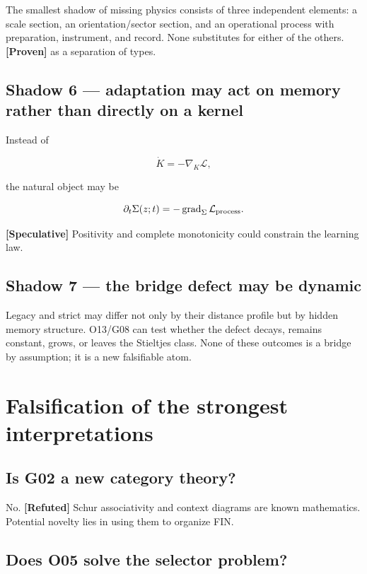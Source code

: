 \documentclass[11pt,a4paper,openany]{report}
\newcommand{\statusProven}{\textcolor{fingreen}{[Proven]}}
\newcommand{\statusSpeculative}{\textcolor{finorange}{[Speculative]}}
\newcommand{\statusRefuted}{\textcolor{finred}{[Refuted]}}
\begin{document}
The smallest shadow of missing physics consists of three independent elements: a scale section, an orientation/\allowbreak{}sector section, and an operational process with preparation, instrument, and record. None substitutes for either of the others. \textbf{\statusProven{}} as a separation of types.

\section{Shadow 6 --- adaptation may act on memory rather than directly on a kernel}

Instead of

\[
\dot K=-\nabla_K\mathcal L,
\]

the natural object may be

\[
\partial_t\Sigma(z;t)
=-\operatorname{grad}_{\Sigma}\mathcal L_{\rm process}.
\]

\textbf{\statusSpeculative{}} Positivity and complete monotonicity could constrain the learning law.

\section{Shadow 7 --- the bridge defect may be dynamic}

Legacy and strict may differ not only by their distance profile but by hidden memory structure. O13/\allowbreak{}G08 can test whether the defect decays, remains constant, grows, or leaves the Stieltjes class. None of these outcomes is a bridge by assumption; it is a new falsifiable atom.

\chapter{Falsification of the strongest interpretations}

\section{Is G02 a new category theory?}

No. \textbf{\statusRefuted{}} Schur associativity and context diagrams are known mathematics. Potential novelty lies in using them to organize FIN.

\section{Does O05 solve the selector problem?}
\end{document}
